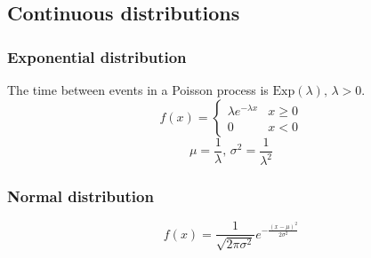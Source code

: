 \subsection{Continuous distributions}


\subsubsection{Exponential distribution}
The time between events in a Poisson process is $\textrm{Exp}(\lambda),\,\lambda>0$.
\[f(x) = \left\{
\begin{array}{cl}
\lambda e^{-\lambda x} & x\geq0\\
0 & x<0
\end{array}\right.\]
\[\mu=\frac{1}{\lambda},\,\sigma^2=\frac{1}{\lambda^2}\]

\subsubsection{Normal distribution}
\[ f(x) = \frac{1}{\sqrt{2\pi\sigma^2}}e^{-\frac{(x-\mu)^2}{2\sigma^2}} \]

